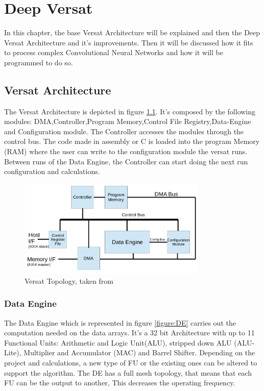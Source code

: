 \chapter{Deep Versat}
\label{chapter:DeepVersat}

In this chapter, the base Versat Architecture will be explained and then the Deep Versat Architecture
 and it's improvements. Then it will be discussed how
 it  fits to process complex Convolutional Neural Networks and how it will be programmed to do so.


\section{Versat Architecture}

The Versat Architecture \cite{sousa:compiler,sousa:controller,sousa:FFT,sousa:versat2016} 
is depicted in figure \ref{figure:oldversat}. It's composed by the following modules: DMA,Controller,Program Memory,Control File Registry,Data-Engine and Configuration module.
The Controller accesses the modules through the control bus. The code made in assembly or C is loaded into the program Memory (RAM) where the user
can write to the configuration module the versat runs. Between runs of the Data Engine,
 the Controller can start doing the next run configuration and calculations.


\begin{figure}[!htbp]
    \centering
    \includegraphics[width=0.8\textwidth]{Figures/top.png}
    \caption{Versat Topology, taken from~\cite{sousa:controller}}
    \label{figure:oldversat}
\end{figure} 

\subsection{Data Engine}
The Data Engine which is represented in figure \ref{figure:DE} carries out the computation needed on the data arrays. It's a 32 bit Architecture with up to 11 Functional Units:
 Arithmetic and Logic Unit(ALU), stripped down ALU (ALU-Lite),
 Multiplier and Accumulator (MAC) and Barrel Shifter.
 Depending on the project and calculations, a new type of FU or the existing ones can be altered to support the algorithm.
 The DE has a full mesh  topology, that means that each FU can be the output to another, This decreases the operating frequency.

